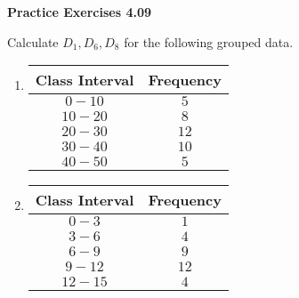 \vspace{0.3ex}
\noindent\textbf{Practice Exercises 4.09}

\vspace{0.2ex}

Calculate \(D_1, D_6, D_8\) for the following grouped data.  
\begin{multicols}{2}
\begin{enumerate}
    \item 
    \begin{tabular}{|c|c|}
        \hline
        Class Interval & Frequency \\ \hline
        \(0 - 10\) & \(5\) \\ \hline
        \(10 - 20\) & \(8\) \\ \hline
        \(20 - 30\) & \(12\) \\ \hline
        \(30 - 40\) & \(10\) \\ \hline
        \(40 - 50\) & \(5\) \\ \hline
    \end{tabular}
    \item 
    \begin{tabular}{|c|c|}
        \hline
        Class Interval & Frequency \\ \hline
        \(0 - 3\) & \(1\) \\ \hline
        \(3 - 6\) & \(4\) \\ \hline
        \(6 - 9\) & \(9\) \\ \hline
        \(9 - 12\) & \(12\) \\ \hline
        \(12 - 15\) & \(4\) \\ \hline
    \end{tabular}
    \end{enumerate}
 \end{multicols}

